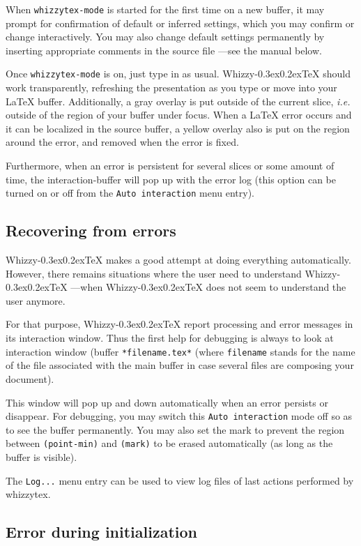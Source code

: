 \documentclass{article}
\makeatletter
\let \lst \verb
\def \whizzy {{Whizzy\kern -0.3ex\raise 0.2ex\hbox{\let \@\relax\TeX}}}
\makeatother
\begin{document}
When {\tt whizzytex-mode} is started for the first time on a new buffer, it
may prompt for confirmation of default or inferred settings, which you may
confirm or change interactively. You may also change default settings
permanently by inserting appropriate comments in the source file ---see the
manual below.

Once {\tt whizzytex-mode} is on, just type in as usual.  {\whizzy} should work
transparently, refreshing the presentation as you type or move into your
{\LaTeX} buffer. Additionally, a gray overlay is put outside
of the current slice, {\em i.e.} outside of the region of your buffer under
focus. When a {\LaTeX} error occurs and it can be localized in
the  source buffer, a yellow overlay also is put on the region around the
error, and removed when the error is fixed.

Furthermore, when an error is persistent for several slices or some amount
of time, the interaction-buffer will pop up with the error log
(this option can be turned on or off from the {\tt Auto interaction} menu
entry).  

\subsection {Recovering from errors}

{\whizzy} makes a good attempt at doing everything automatically. 
However, there remains situations where the user need to understand 
{\whizzy} ---when {\whizzy} does not seem to understand the user anymore. 

For that purpose, {\whizzy} report processing and error messages
in its interaction window. Thus the first help for debugging
is always to look at interaction window (buffer 
\lst"*filename.tex*" (where \lst"filename" stands for the name of the file
associated with the main buffer in case several files are composing your
document). 

This window will pop up and down automatically when an error persists or
disappear. For debugging, you may switch this {\tt Auto interaction} mode
off so as to see the buffer permanently. You may also set the mark 
to prevent the region between \lst"(point-min)" and \lst"(mark)" to be
erased automatically (as long as the buffer is visible). 

The {\tt Log...} menu entry can be used to view log files of
last actions performed by whizzytex. 

\subsection {Error during initialization}
\end{document}
